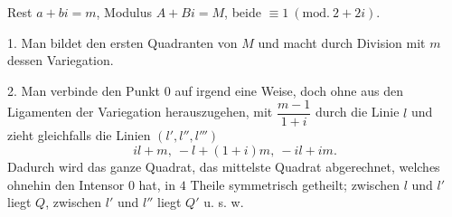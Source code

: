 \NoSourceHead
{}
\par\indent Rest $a+bi=m$, Modulus $A+Bi=M$, beide $\equiv1\ (\mathrm{mod.}\ 2+2i)$.

1. Man bildet den ersten Quadranten von $M$ und macht durch Division mit $m$ dessen Variegation.

2. Man verbinde den Punkt $0$ auf irgend eine Weise, doch ohne aus den Ligamenten der Variegation herauszugehen, mit $\dfrac{m-1}{1+i}$ durch die Linie $l$ und zieht gleichfalls die Linien $(l',l'',l''')$
\[
il+m,\ -l+(1+i)m,\ -il+im.
\]
\noindent Dadurch wird das ganze Quadrat, das mittelste Quadrat abgerechnet, welches ohnehin den Intensor $0$ hat, in $4$ Theile symmetrisch getheilt; zwischen $l$ und $l'$ liegt $Q$, zwischen $l'$ und $l''$ liegt $Q'$ u. s. w.
\begin{center}
\end{center}
\clearpage

